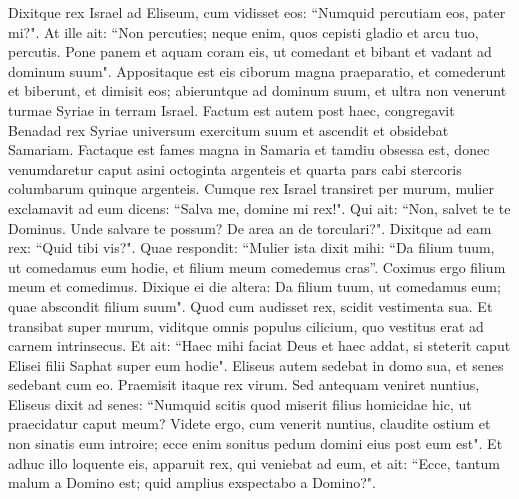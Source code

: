 \begin{biblechapter}
\verse Dixitque rex Israel ad Eliseum, cum vidisset eos: “Numquid percutiam eos, pater mi?". 
\verse At ille ait: “Non percuties; neque enim, quos cepisti gladio et arcu tuo, percutis. Pone panem et aquam coram eis, ut comedant et bibant et vadant ad dominum suum". 
\verse Appositaque est eis ciborum magna praeparatio, et comederunt et biberunt, et dimisit eos; abieruntque ad dominum suum, et ultra non venerunt turmae Syriae in terram Israel. 
\verse Factum est autem post haec, congregavit Benadad rex Syriae universum exercitum suum et ascendit et obsidebat Samariam. 
\verse Factaque est fames magna in Samaria et tamdiu obsessa est, donec venumdaretur caput asini octoginta argenteis et quarta pars cabi stercoris columbarum quinque argenteis. 
\verse Cumque rex Israel transiret per murum, mulier exclamavit ad eum dicens: “Salva me, domine mi rex!". 
\verse Qui ait: “Non, salvet te te Dominus. Unde salvare te possum? De area an de torculari?". Dixitque ad eam rex: “Quid tibi vis?". Quae respondit: 
\verse “Mulier ista dixit mihi: “Da filium tuum, ut comedamus eum hodie, et filium meum comedemus cras”. 
\verse Coximus ergo filium meum et comedimus. Dixique ei die altera: Da filium tuum, ut comedamus eum; quae abscondit filium suum". 
\verse Quod cum audisset rex, scidit vestimenta sua. Et transibat super murum, viditque omnis populus cilicium, quo vestitus erat ad carnem intrinsecus. 
\verse Et ait: “Haec mihi faciat Deus et haec addat, si steterit caput Elisei filii Saphat super eum hodie". 
\verse Eliseus autem sedebat in domo sua, et senes sedebant cum eo. Praemisit itaque rex virum. Sed antequam veniret nuntius, Eliseus dixit ad senes: “Numquid scitis quod miserit filius homicidae hic, ut praecidatur caput meum? Videte ergo, cum venerit nuntius, claudite ostium et non sinatis eum introire; ecce enim sonitus pedum domini eius post eum est". 
\verse Et adhuc illo loquente eis, apparuit rex, qui veniebat ad eum, et ait: “Ecce, tantum malum a Domino est; quid amplius exspectabo a Domino?". 
\end{biblechapter}

